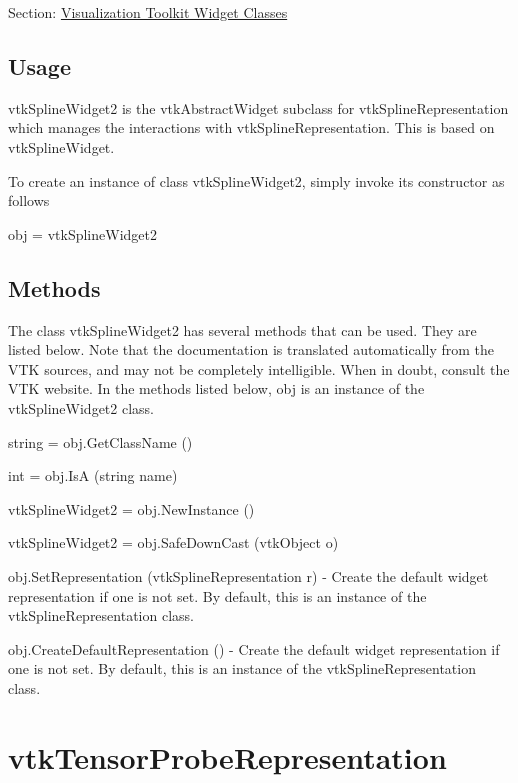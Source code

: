 Section\-: \hyperlink{sec_vtkwidgets}{Visualization Toolkit Widget Classes} \hypertarget{vtkwidgets_vtkxyplotwidget_Usage}{}\subsection{Usage}\label{vtkwidgets_vtkxyplotwidget_Usage}
vtk\-Spline\-Widget2 is the vtk\-Abstract\-Widget subclass for vtk\-Spline\-Representation which manages the interactions with vtk\-Spline\-Representation. This is based on vtk\-Spline\-Widget.

To create an instance of class vtk\-Spline\-Widget2, simply invoke its constructor as follows \begin{DoxyVerb}  obj = vtkSplineWidget2
\end{DoxyVerb}
 \hypertarget{vtkwidgets_vtkxyplotwidget_Methods}{}\subsection{Methods}\label{vtkwidgets_vtkxyplotwidget_Methods}
The class vtk\-Spline\-Widget2 has several methods that can be used. They are listed below. Note that the documentation is translated automatically from the V\-T\-K sources, and may not be completely intelligible. When in doubt, consult the V\-T\-K website. In the methods listed below, {\ttfamily obj} is an instance of the vtk\-Spline\-Widget2 class. 
\begin{DoxyItemize}
\item {\ttfamily string = obj.\-Get\-Class\-Name ()}  
\item {\ttfamily int = obj.\-Is\-A (string name)}  
\item {\ttfamily vtk\-Spline\-Widget2 = obj.\-New\-Instance ()}  
\item {\ttfamily vtk\-Spline\-Widget2 = obj.\-Safe\-Down\-Cast (vtk\-Object o)}  
\item {\ttfamily obj.\-Set\-Representation (vtk\-Spline\-Representation r)} -\/ Create the default widget representation if one is not set. By default, this is an instance of the vtk\-Spline\-Representation class.  
\item {\ttfamily obj.\-Create\-Default\-Representation ()} -\/ Create the default widget representation if one is not set. By default, this is an instance of the vtk\-Spline\-Representation class.  
\end{DoxyItemize}\hypertarget{vtkwidgets_vtktensorproberepresentation}{}\section{vtk\-Tensor\-Probe\-Representation}\label{vtkwidgets_vtktensorproberepresentation}
